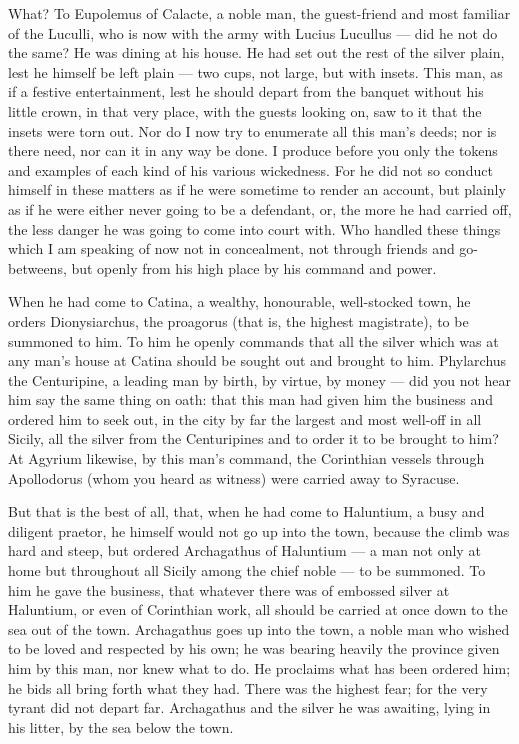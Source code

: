 What? To Eupolemus of Calacte, a noble man, the guest-friend and most familiar of the Luculli, who is now with the army with Lucius Lucullus --- did he not do the same? He was dining at his house. He had set out the rest of the silver plain, lest he himself be left plain --- two cups, not large, but with insets. This man, as if a festive entertainment, lest he should depart from the banquet without his little crown, in that very place, with the guests looking on, saw to it that the insets were torn out. Nor do I now try to enumerate all this man's deeds; nor is there need, nor can it in any way be done. I produce before you only the tokens and examples of each kind of his various wickedness. For he did not so conduct himself in these matters as if he were sometime to render an account, but plainly as if he were either never going to be a defendant, or, the more he had carried off, the less danger he was going to come into court with. Who handled these things which I am speaking of now not in concealment, not through friends and go-betweens, but openly from his high place by his command and power.

 When he had come to Catina, a wealthy, honourable, well-stocked town, he orders Dionysiarchus, the proagorus (that is, the highest magistrate), to be summoned to him. To him he openly commands that all the silver which was at any man's house at Catina should be sought out and brought to him. Phylarchus the Centuripine, a leading man by birth, by virtue, by money --- did you not hear him say the same thing on oath: that this man had given him the business and ordered him to seek out, in the city by far the largest and most well-off in all Sicily, all the silver from the Centuripines and to order it to be brought to him? At Agyrium likewise, by this man's command, the Corinthian vessels through Apollodorus (whom you heard as witness) were carried away to Syracuse.

 But that is the best of all, that, when he had come to Haluntium, a busy and diligent praetor, he himself would not go up into the town, because the climb was hard and steep, but ordered Archagathus of Haluntium --- a man not only at home but throughout all Sicily among the chief noble --- to be summoned. To him he gave the business, that whatever there was of embossed silver at Haluntium, or even of Corinthian work, all should be carried at once down to the sea out of the town. Archagathus goes up into the town, a noble man who wished to be loved and respected by his own; he was bearing heavily the province given him by this man, nor knew what to do. He proclaims what has been ordered him; he bids all bring forth what they had. There was the highest fear; for the very tyrant did not depart far. Archagathus and the silver he was awaiting, lying in his litter, by the sea below the town.

